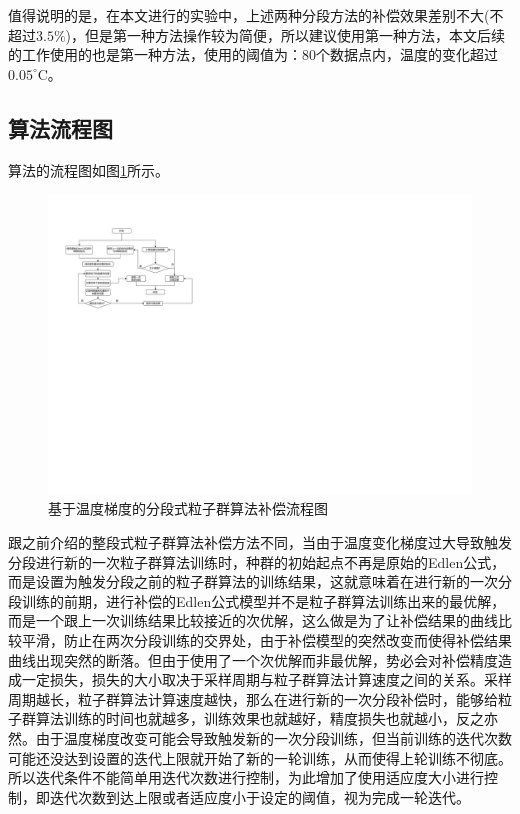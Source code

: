 值得说明的是，在本文进行的实验中，上述两种分段方法的补偿效果差别不大(不超过$3.5\%$)，但是第一种方法操作较为简便，所以建议使用第一种方法，本文后续的工作使用的也是第一种方法，使用的阈值为：80个数据点内，温度的变化超过$0.05^{\circ} \mathrm{C}$。

\subsection{算法流程图}
\label{基于温度梯度的分段式粒子群算法补偿流程图}
算法的流程图如图\ref{fig:基于温度梯度的分段式粒子群算法补偿流程图}所示。
\begin{figure}[htb]
  \centering
  \includegraphics[width=12cm]{fig/4-fig/基于温度梯度的分段式粒子群算法流程图.drawio.pdf}
  \caption{基于温度梯度的分段式粒子群算法补偿流程图}
  \label{fig:基于温度梯度的分段式粒子群算法补偿流程图}
\end{figure}

跟之前介绍的整段式粒子群算法补偿方法不同，当由于温度变化梯度过大导致触发分段进行新的一次粒子群算法训练时，种群的初始起点不再是原始的Edlen公式，而是设置为触发分段之前的粒子群算法的训练结果，这就意味着在进行新的一次分段训练的前期，进行补偿的Edlen公式模型并不是粒子群算法训练出来的最优解，而是一个跟上一次训练结果比较接近的次优解，这么做是为了让补偿结果的曲线比较平滑，防止在两次分段训练的交界处，由于补偿模型的突然改变而使得补偿结果曲线出现突然的断落。但由于使用了一个次优解而非最优解，势必会对补偿精度造成一定损失，损失的大小取决于采样周期与粒子群算法计算速度之间的关系。采样周期越长，粒子群算法计算速度越快，那么在进行新的一次分段补偿时，能够给粒子群算法训练的时间也就越多，训练效果也就越好，精度损失也就越小，反之亦然。由于温度梯度改变可能会导致触发新的一次分段训练，但当前训练的迭代次数可能还没达到设置的迭代上限就开始了新的一轮训练，从而使得上轮训练不彻底。所以迭代条件不能简单用迭代次数进行控制，为此增加了使用适应度大小进行控制，即迭代次数到达上限或者适应度小于设定的阈值，视为完成一轮迭代。

